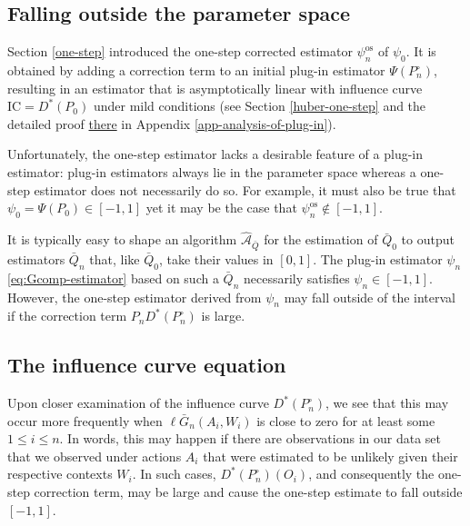 \documentclass[
  11pt,
  openright,twoside]{book}
\newcommand{\Algo}{\widehat{\mathcal{A}}}
\newcommand{\IC}{\textrm{IC}}
\newcommand{\Gbar}{\bar{G}}
\newcommand{\psinos}{\psi_{n}^{\textrm{os}}}
\newcommand{\Phat}{P^{\circ}}
\newcommand{\Qbar}{\bar{Q}}
\theoremstyle{definition}
\theoremstyle{definition}
\theoremstyle{definition}
\theoremstyle{definition}
\theoremstyle{remark}
\begin{document}
\hypertarget{falling-outside-the-parameter-space}{%
\subsection{Falling outside the parameter space}\label{falling-outside-the-parameter-space}}

Section \ref{one-step} introduced the one-step corrected estimator \(\psinos\)
of \(\psi_0\). It is obtained by adding a correction term to an initial plug-in
estimator \(\Psi(\Phat_{n})\), resulting in an estimator that is asymptotically
linear with influence curve \(\IC = D^{*}(P_{0})\) under mild conditions (see
Section \ref{huber-one-step} and the detailed
proof \protect\hyperlink{app-analysis-of-plug-in}{there} in Appendix
\ref{app-analysis-of-plug-in}).

Unfortunately, the one-step estimator lacks a desirable feature of a plug-in
estimator: plug-in estimators always lie in the parameter space whereas a
one-step estimator does not necessarily do so. For example, it must also be
true that \(\psi_0 = \Psi(P_{0}) \in [-1,1]\) yet it may be the case that
\(\psinos \not\in[-1,1]\).

It is typically easy to shape an algorithm \(\Algo_{\Qbar}\) for the estimation
of \(\Qbar_0\) to output estimators \(\Qbar_n\) that, like \(\Qbar_{0}\), take their
values in \([0,1]\). The plug-in estimator \(\psi_{n}\) \eqref{eq:Gcomp-estimator}
based on such a \(\Qbar_{n}\) necessarily satisfies \(\psi_{n} \in [-1,1]\).
However, the one-step estimator derived from \(\psi_{n}\) may fall outside of
the interval if the correction term \(P_{n} D^{*} (\Phat_{n})\) is large.

\hypertarget{eic-equation}{%
\subsection{The influence curve equation}\label{eic-equation}}

Upon closer examination of the influence curve \(D^*(\Phat_{n})\), we see that
this may occur more frequently when \(\ell \Gbar_n(A_i,W_i)\) is close to zero
for at least some \(1 \leq i\leq n\). In words, this may happen if there are
observations in our data set that we observed under actions \(A_i\) that were
estimated to be unlikely given their respective contexts \(W_i\). In such
cases, \(D^*(\Phat_n)(O_i)\), and consequently the one-step correction term, may
be large and cause the one-step estimate to fall outside \([-1,1]\).
\end{document}
